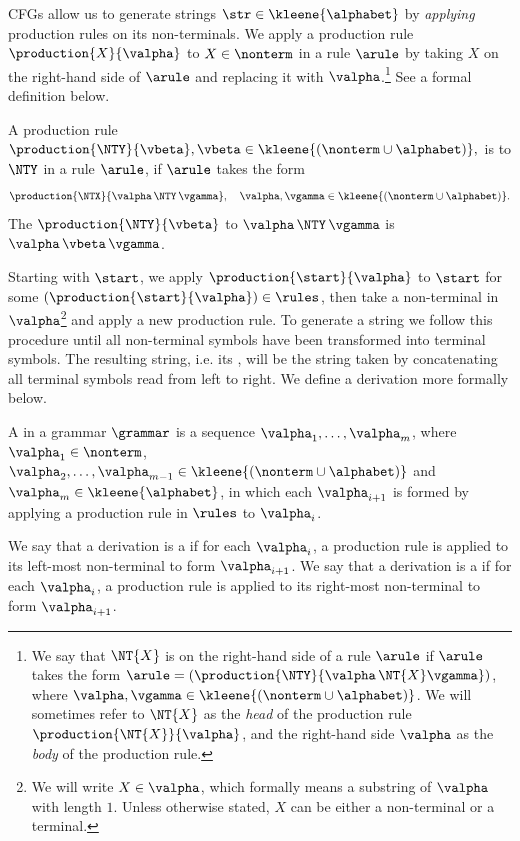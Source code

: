 CFGs allow us to generate strings $\str\in\kleene{\alphabet}$ by \emph{applying} production rules on its non-terminals. 
We apply a production rule $\production{X}{\valpha}$ to $X\in\nonterm$ in a rule $\arule$ by taking $X$ on the right-hand side of $\arule$ and replacing it with $\valpha$.\footnote{We say that $\NT{X}$ is on the right-hand side of a rule $\arule$ if $\arule$ takes the form $\arule=(\production{\NTY}{\valpha \, \NT{X} \vgamma})$, where $\valpha,\vgamma\in\kleene{(\nonterm\cup \alphabet)}$. 
We will sometimes refer to $\NT{X}$ as the \emph{head} of the production rule $\production{\NT{X}}{\valpha}$, and the right-hand side $\valpha$ as the \emph{body} of the production rule.} See a formal definition below.

\begin{definition}
    A production rule $\production{\NTY}{\vbeta}, \vbeta\in\kleene{(\nonterm\cup\alphabet)},$ is  to $\NTY$ in a rule $\arule$, if $\arule$ takes the form 
    \begin{equation*}
        \production{\NTX}{\valpha \, \NTY \, \vgamma}, \quad \valpha,\vgamma\in\kleene{(\nonterm\cup\alphabet)}.
    \end{equation*}
    The  $\production{\NTY}{\vbeta}$ to $\valpha \, \NTY \, \vgamma$ is $\valpha \, \vbeta \, \vgamma$.
\end{definition}

Starting with $\start$, we apply $\production{\start}{\valpha}$ to $\start$ for some $(\production{\start}{\valpha})\in\rules$, then take a non-terminal in $\valpha$\footnote{We will write $X\in\valpha$, which formally means a substring of $\valpha$ with length $1$. Unless otherwise stated, $X$ can be either a non-terminal or a terminal.} and apply a new production rule. To generate a string we follow this procedure until all non-terminal symbols have been transformed into terminal symbols. The resulting string, i.e. its , will be the string taken by concatenating all terminal symbols read from left to right. 
We define a derivation more formally below.

\begin{definition}[Derivation]
    A  in a grammar $\grammar$ is a sequence $\valpha_1,\dots,\valpha_m$, where $\valpha_1\in\nonterm$, $\valpha_2,\dots,\valpha_{m-1}\in\kleene{(\nonterm\cup \alphabet)}$ and $\valpha_m\in\kleene{\alphabet}$, in which each $\valpha_{i+1}$ is formed by applying a production rule in $\rules$ to $\valpha_{i}$. 
    
    We say that a derivation is a  if for each $\valpha_i$, a production rule is applied to its left-most non-terminal to form $\valpha_{i+1}$.  
    We say that a derivation is a  if for each $\valpha_i$, a production rule is applied to its right-most non-terminal to form $\valpha_{i+1}$.
\end{definition}

